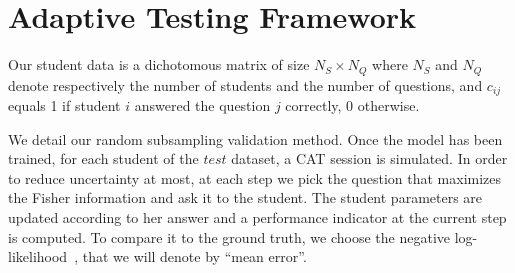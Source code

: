 \documentclass{edm_template}
\begin{document}
\section{Adaptive Testing Framework}

Our student data is a dichotomous matrix of size $N_S \times N_Q$ where $N_S$ and $N_Q$ denote respectively the number of students and the number of questions, and $c_{ij}$ equals 1 if student $i$ answered the question $j$ correctly, 0 otherwise. 

We detail our random subsampling validation method. Once the model has been trained, for each student of the $test$ dataset, a CAT session is simulated. In order to reduce uncertainty at most, at each step we pick the question that maximizes the Fisher information and ask it to the student. The student parameters are updated according to her answer and a performance indicator at the current step is computed. To compare it to the ground truth, we choose the negative log-likelihood~\cite{Gneiting2007}, that we will denote by ``mean error''. %

\vspace*{-2mm}

%


%
%
%
\end{document}
